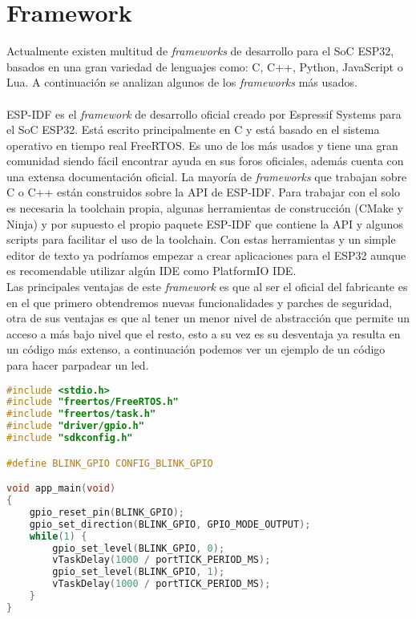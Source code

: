 \documentclass[../proyecto.tex]{subfiles}
\begin{document}
\section{Framework}

Actualmente existen multitud de \textit{frameworks} de desarrollo para el SoC ESP32, basados en una gran variedad de lenguajes como: C, C++, Python, JavaScript o Lua. A continuación se analizan algunos de los  \textit{frameworks} más usados.\\

\\
ESP-IDF es el \textit{framework} de desarrollo oficial creado por Espressif Systems para el SoC ESP32. Está escrito principalmente en C  y está basado en el sistema operativo en tiempo real FreeRTOS. Es uno de los más usados y tiene una gran comunidad siendo fácil encontrar ayuda en sus foros oficiales, además cuenta con una extensa documentación oficial. La mayoría de \textit{frameworks} que trabajan sobre C o C++ están construidos sobre la API de ESP-IDF. Para trabajar con el solo es necesaria la toolchain propia, algunas herramientas de construcción (CMake y Ninja) y por supuesto el propio paquete ESP-IDF que contiene la API y algunos scripts para facilitar el uso de la toolchain. Con estas herramientas y un simple editor de texto ya podríamos empezar a crear aplicaciones para el ESP32 aunque es recomendable utilizar algún IDE como PlatformIO IDE.\\

 Las principales ventajas de este \textit{framework} es que al ser el oficial del fabricante es en el que primero obtendremos nuevas funcionalidades y parches de seguridad, otra de sus ventajas es que al tener un menor nivel de abstracción que permite un acceso a más bajo nivel que el resto, esto a su vez es su desventaja ya resulta en un código más extenso, a continuación podemos ver un ejemplo de un código para hacer parpadear un led.\\

\begin{minipage}{\linewidth}
\begin{lstlisting}[language=C, caption=Ejemplo de código para hacer parpadear un led con ESP-IDF, captionpos=b, frame=single]
#include <stdio.h>
#include "freertos/FreeRTOS.h"
#include "freertos/task.h"
#include "driver/gpio.h"
#include "sdkconfig.h"

#define BLINK_GPIO CONFIG_BLINK_GPIO

void app_main(void)
{
    gpio_reset_pin(BLINK_GPIO);
    gpio_set_direction(BLINK_GPIO, GPIO_MODE_OUTPUT);
    while(1) {
        gpio_set_level(BLINK_GPIO, 0);
        vTaskDelay(1000 / portTICK_PERIOD_MS);
        gpio_set_level(BLINK_GPIO, 1);
        vTaskDelay(1000 / portTICK_PERIOD_MS);
    }
}
\end{lstlisting}
\end{minipage}
\end{document}
